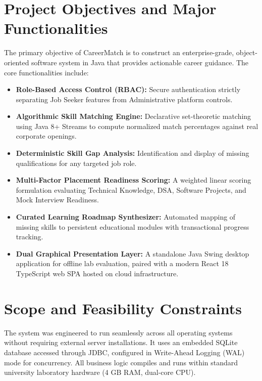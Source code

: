 \documentclass[11pt,a4paper]{report}
\begin{document}
\section{Project Objectives and Major Functionalities}
The primary objective of CareerMatch is to construct an enterprise-grade, object-oriented software system in Java that provides actionable career guidance. The core functionalities include:
\begin{itemize}
    \item \textbf{Role-Based Access Control (RBAC):} Secure authentication strictly separating Job Seeker features from Administrative platform controls.
    \item \textbf{Algorithmic Skill Matching Engine:} Declarative set-theoretic matching using Java 8+ Streams to compute normalized match percentages against real corporate openings.
    \item \textbf{Deterministic Skill Gap Analysis:} Identification and display of missing qualifications for any targeted job role.
    \item \textbf{Multi-Factor Placement Readiness Scoring:} A weighted linear scoring formulation evaluating Technical Knowledge, DSA, Software Projects, and Mock Interview Readiness.
    \item \textbf{Curated Learning Roadmap Synthesizer:} Automated mapping of missing skills to persistent educational modules with transactional progress tracking.
    \item \textbf{Dual Graphical Presentation Layer:} A standalone Java Swing desktop application for offline lab evaluation, paired with a modern React 18 TypeScript web SPA hosted on cloud infrastructure.
\end{itemize}

\section{Scope and Feasibility Constraints}
The system was engineered to run seamlessly across all operating systems without requiring external server installations. It uses an embedded SQLite database accessed through JDBC, configured in Write-Ahead Logging (WAL) mode for concurrency. All business logic compiles and runs within standard university laboratory hardware (4 GB RAM, dual-core CPU).

\end{document}
